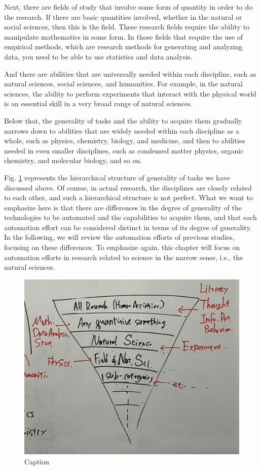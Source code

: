 Next, there are fields of study that involve some form of quantity in order to do the research. If there are basic quantities involved, whether in the natural or social sciences, then this is the field. These research fields require the ability to manipulate mathematics in some form. In those fields that require the use of empirical methods, which are research methods for generating and analyzing data, you need to be able to use statistics and data analysis.

And there are abilities that are universally needed within each discipline, such as natural sciences, social sciences, and humanities. For example, in the natural sciences, the ability to perform experiments that interact with the physical world is an essential skill in a very broad range of natural sciences.

Below that, the generality of tasks and the ability to acquire them gradually narrows down to abilities that are widely needed within each discipline as a whole, such as physics, chemistry, biology, and medicine, and then to abilities needed in even smaller disciplines, such as condensed matter physics, organic chemistry, and molecular biology, and so on.

Fig. \ref{fig:generality_level} represents the hierarchical structure of generality of tasks we have discussed above. Of course, in actual research, the disciplines are closely related to each other, and such a hierarchical structure is not perfect. What we want to emphasize here is that there are differences in the degree of generality of the technologies to be automated and the capabilities to acquire them, and that each automation effort can be considered distinct in terms of its degree of generality. In the following, we will review the automation efforts of previous studies, focusing on these differences. To emphasize again, this chapter will focus on automation efforts in research related to science in the narrow sense, i.e., the natural sciences.


\begin{figure}[htb]
    \centering
    \includegraphics[width=\linewidth]{figs/generality_level.jpg}
    \caption{Caption}
    \label{fig:generality_level}
\end{figure}

